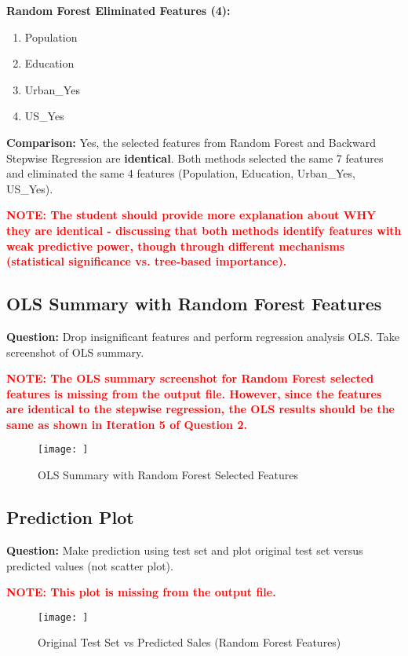 \documentclass[11pt]{article}
\begin{document}
\textbf{Random Forest Eliminated Features (4):}
\begin{enumerate}
    \item Population
    \item Education
    \item Urban\_Yes
    \item US\_Yes
\end{enumerate}

\textbf{Comparison:} Yes, the selected features from Random Forest and Backward Stepwise Regression are \textbf{identical}. Both methods selected the same 7 features and eliminated the same 4 features (Population, Education, Urban\_Yes, US\_Yes).

\textcolor{red}{\textbf{NOTE: The student should provide more explanation about WHY they are identical - discussing that both methods identify features with weak predictive power, though through different mechanisms (statistical significance vs. tree-based importance).}}

\subsection{OLS Summary with Random Forest Features}

\textbf{Question:} Drop insignificant features and perform regression analysis OLS. Take screenshot of OLS summary.

\textcolor{red}{\textbf{NOTE: The OLS summary screenshot for Random Forest selected features is missing from the output file. However, since the features are identical to the stepwise regression, the OLS results should be the same as shown in Iteration 5 of Question 2.}}

\begin{figure}[H]
    \centering
    \texttt{[image: ]}
    \caption{OLS Summary with Random Forest Selected Features}
    \label{fig:rf_ols}
\end{figure}

\subsection{Prediction Plot}

\textbf{Question:} Make prediction using test set and plot original test set versus predicted values (not scatter plot).

\textcolor{red}{\textbf{NOTE: This plot is missing from the output file.}}

\begin{figure}[H]
    \centering
    \texttt{[image: ]}
    \caption{Original Test Set vs Predicted Sales (Random Forest Features)}
    \label{fig:rf_prediction}
\end{figure}
\end{document}
